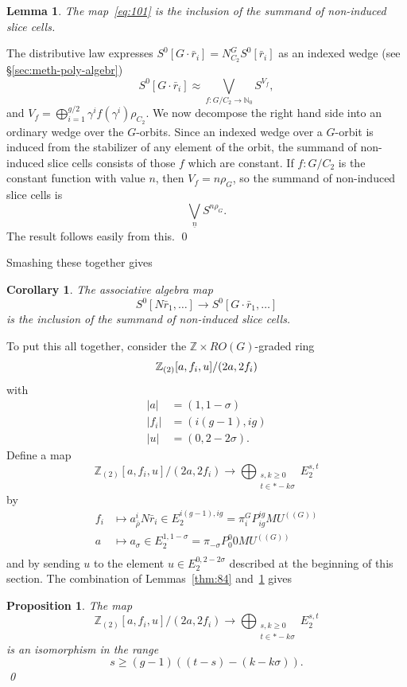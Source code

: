 \documentclass{amsart}
\newtheorem{cor}[equation]{Corollary}
\newtheorem{lem}[equation]{Lemma}
\newtheorem{prop}[equation]{Proposition}
\theoremstyle{definition}
\theoremstyle{remark}
\newenvironment{pf}{\bigskip{\em Proof:\/}}{\qed\medskip}
\newcommand{\Z}{{\mathbb Z}}
\newcommand{\mutn}[1]{MU^{(\!(#1)\!)}}
\newcommand{\slc}[2]{P_{#1}^{#1}#2}
\newcommand{\norm}{N}
\newcommand{\gbar}{\bar}
\newcommand{\rr}{\gbar{r}}
\newcommand{\zt}{C_{2}}
\newcommand{\nat}{\mathbb N_{0}}
\begin{document}
\begin{lem}
\label{thm:68}
The map~\eqref{eq:101} is the inclusion of the summand of non-induced
slice cells.
\end{lem}

\begin{pf}
The distributive law expresses $S^{0}[G\cdot\rr_{i}]=
\norm_{\zt}^{G}S^{0}[\rr_{i}]$ as an indexed wedge (see \S\ref{sec:meth-poly-algebr})
\[
S^{0}[G\cdot\rr_{i}] \approx \bigvee_{f:G/\zt\to\nat} S^{V_{f}},
\]
and $V_{f}=\bigoplus_{i=1}^{g/2}\gamma^{i}f(\gamma^{i})\rho_{\zt}$.
We now decompose the right hand side into an ordinary wedge over the
$G$-orbits.  Since an indexed wedge over a $G$-orbit is induced from
the stabilizer of any element of the orbit, the summand of non-induced
slice cells consists of those $f$ which are constant.   If $f:G/\zt$ is the
constant function with value $n$, then $V_{f}=n\rho_{G}$, so the
summand of non-induced slice cells is
\[
\bigvee_{\underline{n}} S^{n\rho_{G}}.
\]
The result follows easily from this.
\end{pf}

Smashing these together gives
\begin{cor}
\label{thm:82}
The associative algebra map 
\[
S^{0}[\norm\rr_{1},\dots]\to 
S^{0}[G\cdot\rr_{1},\dots]
\]
is the inclusion of the summand of non-induced slice cells.   
\end{cor}

To put this all together, consider the $\Z\times RO(G)$-graded ring
\[
\Z_{(2)}[a,f_{i}, u]/(2a, 2 f_{i})  \\
\]
with 
\begin{align*}
|a| &=(1,1-\sigma) \\
|f_{i}| &= (i(g-1),i g) \\
|u| &= (0,2-2\sigma).
\end{align*}
Define a map
\begin{equation}
\Z_{(2)}[a,f_{i}, u]/(2a, 2 f_{i}) \to \bigoplus_{\substack{s,k\ge 0 \\
t\in \ast-k\sigma}}E_{2}^{s,t}
\end{equation}
by 
\begin{align*}
f_{i} &\mapsto a_{\bar{\rho}}^{i}\norm\rr_{i}\in
E_{2}^{i(g-1), ig}=\pi_{i}^{G}\slc{ig}{\mutn{G}} \\
a &\mapsto a_{\sigma}\in E_{2}^{1,1-\sigma} = \pi_{-\sigma}
\slc{0}{0}\mutn{G} \\
\end{align*}
and by sending $u$ to the element $u\in E_{2}^{0,2-2\sigma}$ described
at the beginning of this section.  The combination of
Lemmas~\ref{thm:84} and~\ref{thm:68} gives
\begin{prop}
\label{thm:133}
The map
\begin{equation}
\label{eq:13}
\Z_{(2)}[a,f_{i}, u]/(2a, 2 f_{i}) \to \bigoplus_{\substack{s,k\ge 0 \\
t\in \ast-k\sigma}}E_{2}^{s,t}
\end{equation}
is an isomorphism in the range
\[
s\ge (g-1)((t-s)-(k-k\sigma)).  
\]
\qed
\end{prop}
\end{document}
